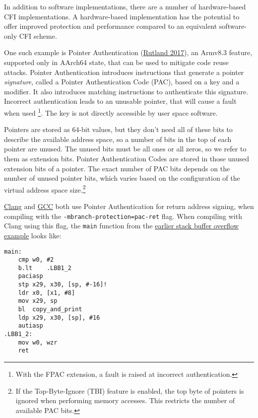\documentclass[
  a4paper,
]{report}
\begin{document}
In addition to software implementations, there are a number of
hardware-based CFI implementations. A hardware-based implementation has
the potential to offer improved protection and performance compared to
an equivalent software-only CFI scheme.

One such example is Pointer Authentication
(\protect\hyperlink{ref-Rutland2017}{Rutland 2017}), an Armv8.3 feature,
supported only in AArch64 state, that can be used to mitigate code reuse
attacks. Pointer Authentication introduces instructions that generate a
pointer \emph{signature}, called a Pointer Authentication Code (PAC),
based on a key and a modifier. It also introduces matching instructions
to authenticate this signature. Incorrect authentication leads to an
unusable pointer, that will cause a fault when used \footnote{With the
  FPAC extension, a fault is raised at incorrect authentication.}. The
key is not directly accessible by user space software.

Pointers are stored as 64-bit values, but they don't need all of these
bits to describe the available address space, so a number of bits in the
top of each pointer are unused. The unused bits must be all ones or all
zeros, so we refer to them as extension
bits. Pointer Authentication Codes are
stored in those unused extension bits of a pointer. The exact number of
PAC bits depends on the number of unused pointer bits, which varies
based on the configuration of the virtual address space size.\footnote{If
  the Top-Byte-Ignore (TBI) feature is
  enabled, the top byte of pointers is ignored when performing memory
  accesses. This restricts the number of available PAC bits.}

\href{https://clang.llvm.org/docs/ClangCommandLineReference.html\#aarch64}{Clang}
and \href{https://gcc.gnu.org/onlinedocs/gcc/AArch64-Options.html}{GCC}
both use Pointer Authentication for return address signing, when
compiling with the \texttt{-mbranch-protection=pac-ret} flag. When
compiling with Clang using this flag, the \texttt{main} function from
the \protect\hyperlink{stack-buffer-overflow}{earlier stack buffer
overflow example} looks like:

\begin{verbatim}
main:
    cmp w0, #2
    b.lt    .LBB1_2
    paciasp
    stp x29, x30, [sp, #-16]!
    ldr x0, [x1, #8]
    mov x29, sp
    bl  copy_and_print
    ldp x29, x30, [sp], #16
    autiasp
.LBB1_2:
    mov w0, wzr
    ret
\end{verbatim}
\end{document}
